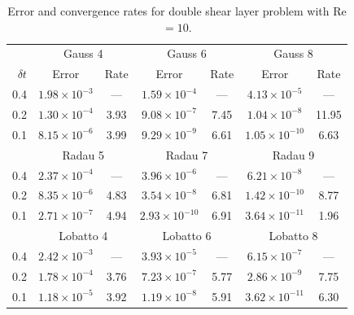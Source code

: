 \documentclass[review]{siamart}
\begin{document}
\begin{table}[h!]
	\centering
	\caption{Error and convergence rates for double shear layer problem with Re$=10$.}
	\label{tab:tgv-errors}
	\begin{tabular}{r|cccccc}
		\toprule
		& \multicolumn{2}{c}{Gauss 4} & \multicolumn{2}{c}{Gauss 6} & \multicolumn{2}{c}{Gauss 8}\\
		$\delta t$ & Error & Rate & Error & Rate & Error & Rate\\
		\midrule
		0.4 & $1.98\times 10^{-3}$ & --- & $1.59\times 10^{-4}$ & --- & $4.13\times 10^{-5}$ & --- \\
		0.2 & $1.30\times 10^{-4}$ & 3.93 & $9.08\times 10^{-7}$ & 7.45 & $1.04\times 10^{-8}$ & 11.95 \\
		0.1 & $8.15\times 10^{-6}$ & 3.99 & $9.29\times 10^{-9}$ & 6.61 & $1.05\times 10^{-10}$ & 6.63 \\
		\midrule
		& \multicolumn{2}{c}{Radau 5} & \multicolumn{2}{c}{Radau 7} & \multicolumn{2}{c}{Radau 9}\\
		\midrule
		0.4 & $2.37\times 10^{-4}$ & --- & $3.96\times 10^{-6}$ & --- & $6.21\times 10^{-8}$ & --- \\
		0.2 & $8.35\times 10^{-6}$ & 4.83 & $3.54\times 10^{-8}$ & 6.81 & $1.42\times 10^{-10}$ & 8.77  \\
		0.1 & $2.71\times 10^{-7}$ & 4.94 & $2.93\times 10^{-10}$ & 6.91 & $3.64\times 10^{-11}$ & 1.96 \\
		\midrule
		& \multicolumn{2}{c}{Lobatto 4} & \multicolumn{2}{c}{Lobatto 6} & \multicolumn{2}{c}{Lobatto 8}\\
		\midrule
		0.4 & $2.42\times 10^{-3}$ & --- & $3.93\times 10^{-5}$ & --- & $6.15\times 10^{-7}$ & --- \\
		0.2 & $1.78\times 10^{-4}$ & 3.76 & $7.23\times 10^{-7}$ & 5.77 & $2.86\times 10^{-9}$ & 7.75 \\
		0.1 & $1.18\times 10^{-5}$ & 3.92 & $1.19\times 10^{-8}$ & 5.91 & $3.62\times 10^{-11}$ & 6.30 \\
		\bottomrule
	\end{tabular}
\end{table}
\end{document}
